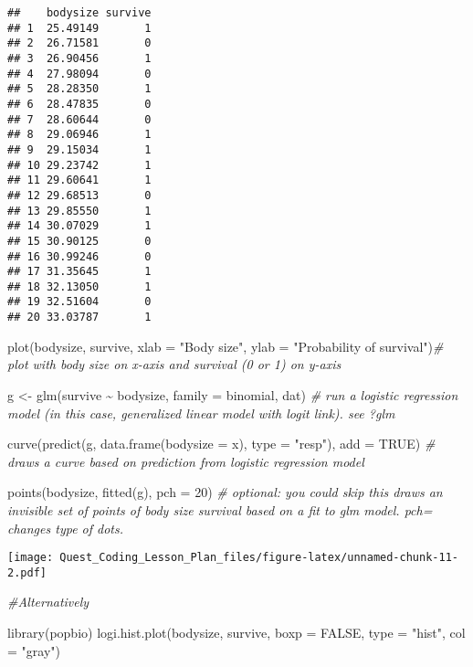 \documentclass[
]{article}
\newenvironment{Shaded}{\begin{snugshade}}{\end{snugshade}}
\newcommand{\AttributeTok}[1]{\textcolor[rgb]{0.77,0.63,0.00}{#1}}
\newcommand{\CommentTok}[1]{\textcolor[rgb]{0.56,0.35,0.01}{\textit{#1}}}
\newcommand{\ConstantTok}[1]{\textcolor[rgb]{0.00,0.00,0.00}{#1}}
\newcommand{\DecValTok}[1]{\textcolor[rgb]{0.00,0.00,0.81}{#1}}
\newcommand{\FunctionTok}[1]{\textcolor[rgb]{0.00,0.00,0.00}{#1}}
\newcommand{\NormalTok}[1]{#1}
\newcommand{\OtherTok}[1]{\textcolor[rgb]{0.56,0.35,0.01}{#1}}
\newcommand{\SpecialCharTok}[1]{\textcolor[rgb]{0.00,0.00,0.00}{#1}}
\newcommand{\StringTok}[1]{\textcolor[rgb]{0.31,0.60,0.02}{#1}}
\begin{document}
\begin{verbatim}
##    bodysize survive
## 1  25.49149       1
## 2  26.71581       0
## 3  26.90456       1
## 4  27.98094       0
## 5  28.28350       1
## 6  28.47835       0
## 7  28.60644       0
## 8  29.06946       1
## 9  29.15034       1
## 10 29.23742       1
## 11 29.60641       1
## 12 29.68513       0
## 13 29.85550       1
## 14 30.07029       1
## 15 30.90125       0
## 16 30.99246       0
## 17 31.35645       1
## 18 32.13050       1
## 19 32.51604       0
## 20 33.03787       1
\end{verbatim}

\begin{Shaded}
\begin{Highlighting}[]
\FunctionTok{plot}\NormalTok{(bodysize, survive, }\AttributeTok{xlab =} \StringTok{"Body size"}\NormalTok{, }\AttributeTok{ylab =} \StringTok{"Probability of survival"}\NormalTok{)}\CommentTok{\# plot with body size on x{-}axis and survival (0 or 1) on y{-}axis}

\NormalTok{g }\OtherTok{\textless{}{-}} \FunctionTok{glm}\NormalTok{(survive }\SpecialCharTok{\textasciitilde{}}\NormalTok{ bodysize, }\AttributeTok{family =}\NormalTok{ binomial, dat) }\CommentTok{\# run a logistic regression model (in this case, generalized linear model with logit link). see ?glm}

\FunctionTok{curve}\NormalTok{(}\FunctionTok{predict}\NormalTok{(g, }\FunctionTok{data.frame}\NormalTok{(}\AttributeTok{bodysize =}\NormalTok{ x), }\AttributeTok{type =} \StringTok{"resp"}\NormalTok{), }\AttributeTok{add =} \ConstantTok{TRUE}\NormalTok{) }\CommentTok{\# draws a curve based on prediction from logistic regression model}

\FunctionTok{points}\NormalTok{(bodysize, }\FunctionTok{fitted}\NormalTok{(g), }\AttributeTok{pch =} \DecValTok{20}\NormalTok{) }\CommentTok{\# optional: you could skip this draws an invisible set of points of body size survival based on a \textquotesingle{}fit\textquotesingle{} to glm model. pch= changes type of dots.}
\end{Highlighting}
\end{Shaded}

\texttt{[image: Quest\_Coding\_Lesson\_Plan\_files/figure-latex/unnamed-chunk-11-2.pdf]}

\begin{Shaded}
\begin{Highlighting}[]
\CommentTok{\#Alternatively}

\FunctionTok{library}\NormalTok{(popbio)}
\FunctionTok{logi.hist.plot}\NormalTok{(bodysize,}
\NormalTok{               survive,}
               \AttributeTok{boxp =} \ConstantTok{FALSE}\NormalTok{,}
               \AttributeTok{type =} \StringTok{"hist"}\NormalTok{,}
               \AttributeTok{col =} \StringTok{"gray"}\NormalTok{)}
\end{Highlighting}
\end{Shaded}
\end{document}
